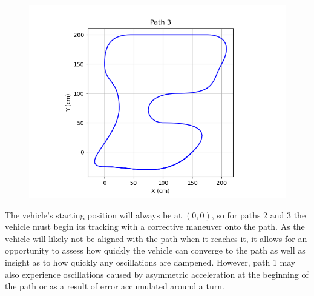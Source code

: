\documentclass[mla8alt]{mla}
\begin{document}
\begin{paper}
\begin{figure}[H]
\includegraphics[width=\linewidth]{pathData/path3}
\label{img:path3}
\endminipage
\end{figure}

The vehicle's starting position will always be at $(0,0)$, so for paths 2 and 3 the vehicle must begin its tracking with a corrective maneuver onto the path. As the vehicle will likely not be aligned with the path when it reaches it, it allows for an opportunity to assess how quickly the vehicle can converge to the path as well as insight as to how quickly any oscillations are dampened. However, path 1 may also experience oscillations caused by asymmetric acceleration at the beginning of the path or as a result of error accumulated around a turn.


\end{paper}
\end{document}

